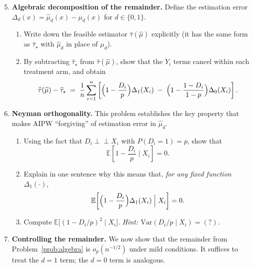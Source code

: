 \documentclass{article}
\newcommand{\Var}{\mathrm{Var}}
\newcommand{\op}{o_p}
\newcommand{\ind}{\perp\!\!\!\perp}
\newcommand{\E}{\mathbb{E}}
\theoremstyle{definition}
\begin{document}
\begin{enumerate}\setcounter{enumi}{4}

\item \textbf{Algebraic decomposition of the remainder.}\label{prob:algebra}
  Define the estimation error $\Delta_d(x) = \widehat{\mu}_d(x) - \mu_d(x)$ for $d \in \{0,1\}$.

  \begin{enumerate}[label=(\alph*)]
    \item Write down the feasible estimator $\widehat{\tau}(\widehat{\mu})$
      explicitly (it has the same form as $\widehat{\tau}_\star$ with
      $\widehat{\mu}_d$ in place of $\mu_d$).

    \item By subtracting $\widehat{\tau}_\star$ from
      $\widehat{\tau}(\widehat{\mu})$, show that the $Y_i$ terms cancel
      within each treatment arm, and obtain
      \[
        \widehat{\tau}(\widehat{\mu}) - \widehat{\tau}_\star
        \;=\;
        \frac{1}{n}\sum_{i=1}^n
        \left[
          \Bigl(1-\frac{D_i}{p}\Bigr)\Delta_1(X_i)
          \;-\;
          \Bigl(1-\frac{1-D_i}{1-p}\Bigr)\Delta_0(X_i)
        \right].
      \]
  \end{enumerate}

\bigskip

\item \textbf{Neyman orthogonality.}\label{prob:orthogonality}
  This problem establishes the key property that makes AIPW ``forgiving''
  of estimation error in $\widehat\mu_d$.

  \begin{enumerate}[label=(\alph*)]
    \item Using the fact that $D_i \ind X_i$ with $P(D_i=1)=p$, show that
      \[
        \E\!\left[1-\frac{D_i}{p}\;\Big|\; X_i\right] = 0.
      \]

    \item Explain in one sentence why this means that, \emph{for any fixed
      function} $\Delta_1(\cdot)$,
      \[
        \E\!\left[\Bigl(1-\frac{D_i}{p}\Bigr)\Delta_1(X_i)\;\Big|\;X_i\right]
        = 0.
      \]

    \item Compute
      $\E\!\bigl[(1-D_i/p)^2 \mid X_i\bigr]$.
      \emph{Hint: $\Var(D_i/p\mid X_i)=(?)$.}
  \end{enumerate}

\bigskip

\item \textbf{Controlling the remainder.}\label{prob:remainder}
  We now show that the remainder from Problem~\ref{prob:algebra} is
  $\op(n^{-1/2})$ under mild conditions.
  It suffices to treat the $d=1$ term; the $d=0$ term is analogous.


\end{enumerate}
\end{document}
